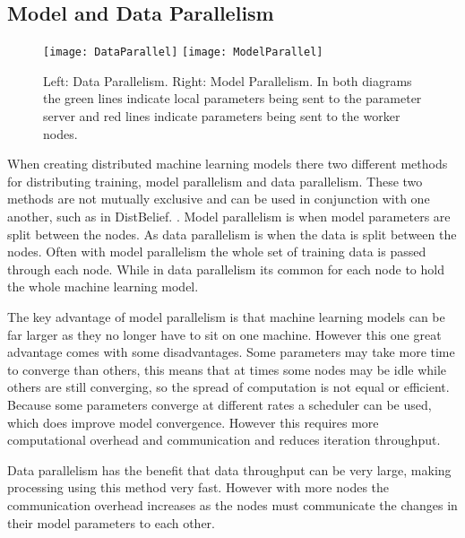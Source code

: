 \subsection{Model and Data Parallelism}
\begin{figure}[h]
    \centering
    \texttt{[image: DataParallel]}
    \texttt{[image: ModelParallel]}
    \caption{Left: Data Parallelism. Right: Model Parallelism. In both diagrams
        the green lines indicate local parameters being sent to the parameter
        server and red lines indicate parameters being sent to the worker nodes.}
\end{figure}
When creating distributed machine learning models there two different methods
for distributing training, model parallelism and data parallelism. These two
methods are not mutually exclusive and can be used in conjunction with one
another, such as in DistBelief. \cite{Dean2012Distbelief}. Model parallelism is
when model parameters are split between the nodes. As data parallelism is when
the data is split between the nodes. \cite{Xing2015Petuum} Often with model
parallelism the whole set of training data is passed through each node. While in
data parallelism its common for each node to hold the whole machine learning
model.

The key advantage of model parallelism is that machine learning models can be
far larger as they no longer have to sit on one machine. However this one great
advantage comes with some disadvantages. Some parameters may take more time to
converge than others, this means that at times some nodes may be idle while
others are still converging, so the spread of computation is not equal or
efficient. \cite{Dean2012Distbelief} Because some parameters converge at
different rates a scheduler can be used, which does improve model convergence.
However this requires more computational overhead and communication and reduces
iteration throughput.
\cite{kim2016STRADS}

Data parallelism has the benefit that data throughput can be very large, making
processing using this method very fast. However with more nodes the
communication overhead increases as the nodes must communicate the changes in
their model parameters to each other. \cite{elgabli2020gadmm}


